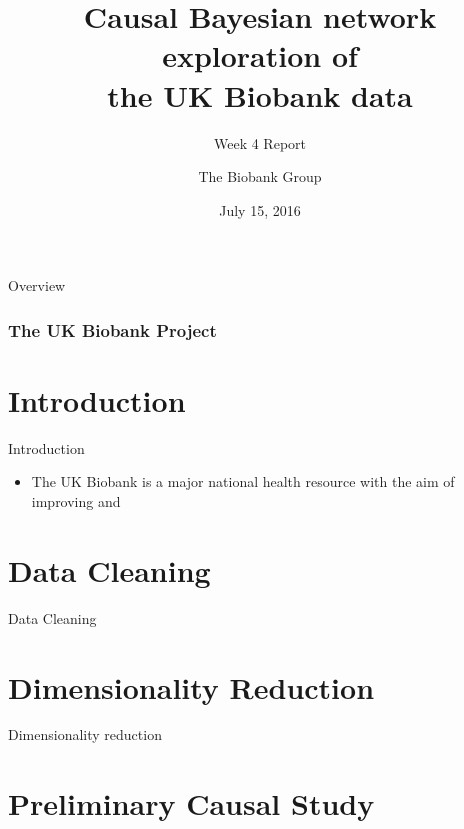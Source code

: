 \documentclass[10pt]{beamer} %
\title{Causal Bayesian network exploration of \\ the UK Biobank data}
\subtitle{Week 4 Report}
\author[The Biobank Group]{The Biobank Group}
\institute[ATI]{The Alan Turing Institute}
\date{July 15, 2016}
\begin{document}
\begin{frame}[plain]
  \titlepage
\end{frame}
\begin{frame}[plain]{Overview}
 \frametitle{The UK Biobank Project}
    \tableofcontents
\end{frame}
\section{Introduction}
\begin{frame}[plain]{Introduction}

\begin{itemize}
\item The UK Biobank is a major national health resource with the aim of improving and 

\end{itemize}



\end{frame}

\section{Data Cleaning}
\begin{frame}[plain]{Data Cleaning}

\end{frame}


\section{Dimensionality Reduction}
\begin{frame}[plain]{Dimensionality reduction}

\end{frame}

\section{Preliminary Causal Study}
\end{document}
